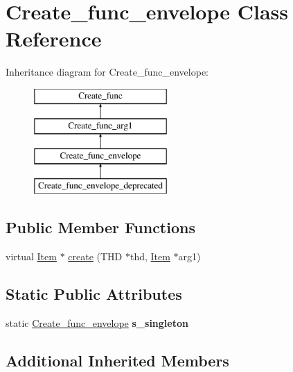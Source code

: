 \hypertarget{classCreate__func__envelope}{}\section{Create\+\_\+func\+\_\+envelope Class Reference}
\label{classCreate__func__envelope}
Inheritance diagram for Create\+\_\+func\+\_\+envelope\+:\begin{figure}[H]
\begin{center}
\leavevmode
\includegraphics[height=4.000000cm]{classCreate__func__envelope}
\end{center}
\end{figure}
\subsection*{Public Member Functions}
\begin{DoxyCompactItemize}
\item 
virtual \mbox{\hyperlink{classItem}{Item}} $\ast$ \mbox{\hyperlink{classCreate__func__envelope_a7d2f9842672a527c792c1f25ee7a45f9}{create}} (T\+HD $\ast$thd, \mbox{\hyperlink{classItem}{Item}} $\ast$arg1)
\end{DoxyCompactItemize}
\subsection*{Static Public Attributes}
\begin{DoxyCompactItemize}
\item 
\mbox{\label{classCreate__func__envelope_a06ddee28a3e7b124ded835c8b22b29d5}} 
static \mbox{\hyperlink{classCreate__func__envelope}{Create\+\_\+func\+\_\+envelope}} {\bfseries s\+\_\+singleton}
\end{DoxyCompactItemize}
\subsection*{Additional Inherited Members}


